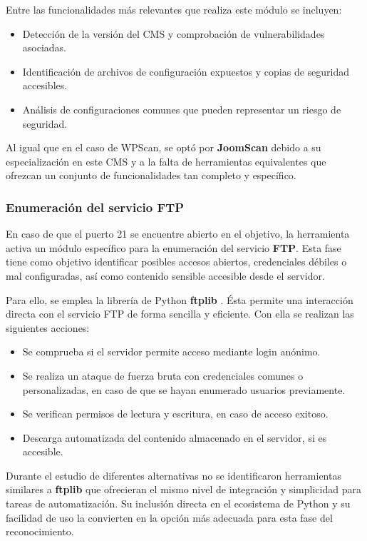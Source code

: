 \begin{parskipenv}
Entre las funcionalidades más relevantes que realiza este módulo se incluyen:

\begin{itemize}
    \item Detección de la versión del CMS y comprobación de vulnerabilidades asociadas.
    \item Identificación de archivos de configuración expuestos y copias de seguridad accesibles.
    \item Análisis de configuraciones comunes que pueden representar un riesgo de seguridad.
\end{itemize}

Al igual que en el caso de WPScan, se optó por \textbf{JoomScan} debido a su especialización en este CMS y a la falta de herramientas equivalentes que ofrezcan un conjunto de funcionalidades tan completo y específico.

\subsubsection*{Enumeración del servicio FTP}
En caso de que el puerto 21 se encuentre abierto en el objetivo, la herramienta activa un módulo específico para la enumeración del servicio \textbf{FTP}. Esta fase tiene como objetivo identificar posibles accesos abiertos, credenciales débiles o mal configuradas, así como contenido sensible accesible desde el servidor.

Para ello, se emplea la librería de Python \textbf{ftplib} \cite{ftplib}. Ésta permite una interacción directa con el servicio FTP de forma sencilla y eficiente. Con ella se realizan las siguientes acciones:

\begin{itemize}
  \item Se comprueba si el servidor permite acceso mediante login anónimo.
  \item Se realiza un ataque de fuerza bruta con credenciales comunes o personalizadas, en caso de que se hayan enumerado usuarios previamente.
  \item Se verifican permisos de lectura y escritura, en caso de acceso exitoso.
  \item Descarga automatizada del contenido almacenado en el servidor, si es accesible.
\end{itemize}

Durante el estudio de diferentes alternativas no se identificaron herramientas similares a \textbf{ftplib} que ofrecieran el mismo nivel de integración y simplicidad para tareas de automatización. Su inclusión directa en el ecosistema de Python y su facilidad de uso la convierten en la opción más adecuada para esta fase del reconocimiento.


\end{parskipenv}
